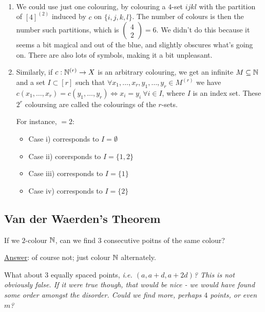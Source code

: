 \documentclass[10pt]{article}
\begin{document}
\begin{remark*}[Remarks]\ 
    \begin{enumerate}
        \item We could use just one colouring, by colouring a $4$-set $ijkl$ with the partition of $[4]^{(2)}$ induced by $c$ on $\{i,j,k,l\}$. The number of colours is then the number such partitions, which is $\left( \begin{array}{c}4 \\ 2\end{array}\right) = 6$. We didn't do this because it seems a bit magical and out of the blue, and slightly obscures what's going on. There are also lots of symbols, making it a bit unpleasant.
        
        \item Similarly, if $c:\mathbb{N}^{(r)}\rightarrow X$ is an arbitrary colouring, we get an infinite $M\subseteq \mathbb{N}$ and a set $I\subset [r]$ such that $\forall x_1,\dots,x_r,y_1,\dots,y_r\in M^{(r)}$ we have $c(x_1,\dots,x_r) = c(y_1,\dots,y_r) \iff x_i=y_i\ \forall i\in I$, where $I$ is an index set. These $2^r$ coloursing are called the  colourings of the $r$-sets.
        
        For instance, $ = 2$:
        \begin{itemize}
            \item Case i) corresponds to $I = \emptyset$
            \item Case ii) corersponds to $I = \{1,2\}$
            \item Case iii) corresponds to $I = \{1\}$
            \item Case iv) corresponds to $I = \{2\}$
        \end{itemize}
    \end{enumerate}    
\end{remark*}

\subsection{Van der Waerden's Theorem}

If we $2$-colour $\mathbb{N}$, can we find $3$ consecutive poitns of the same colour?

\underline{Answer}: of course not; just colour $\mathbb{N}$ alternately.

What about $3$ equally spaced points, \it{i.e.} $(a,a+d,a+2d)$? This is not obviously false. If it were true though, that would be nice - we would have found some order amongst the disorder. Could we find more, perhaps $4$ points, or even $m$?
\end{document}
